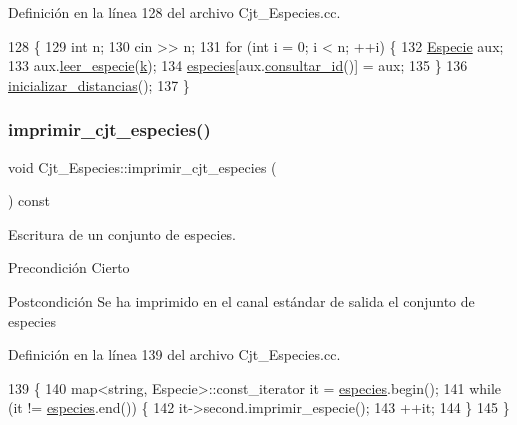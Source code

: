 Definición en la línea 128 del archivo Cjt\+\_\+\+Especies.\+cc.


\begin{DoxyCode}
128                                      \{
129   \textcolor{keywordtype}{int} n;
130   cin >> n;
131   \textcolor{keywordflow}{for} (\textcolor{keywordtype}{int} i = 0; i < n; ++i) \{
132     \hyperlink{class_especie}{Especie} aux;
133     aux.\hyperlink{class_especie_a59b02cb7174198fae20fe23230a527d4}{leer\_especie}(\hyperlink{class_cjt___especies_a4586fb4724b7af4b7f00bb0c0bdd6a17}{k});
134     \hyperlink{class_cjt___especies_a8f319699bd2e8a42b85ec47b67c17563}{especies}[aux.\hyperlink{class_especie_a1652f05cd2ff7dc71123bf538ecc4476}{consultar\_id}()] = aux;
135   \}
136   \hyperlink{class_cjt___especies_a8c711f5a2b07eca652b6086c28e999bc}{inicializar\_distancias}();
137 \}
\end{DoxyCode}
\mbox{\label{class_cjt___especies_ac5f9fbeb99f136c535522466780d4f96}} 
\subsubsection{\texorpdfstring{imprimir\+\_\+cjt\+\_\+especies()}{imprimir\_cjt\_especies()}}
{\footnotesize\ttfamily void Cjt\+\_\+\+Especies\+::imprimir\+\_\+cjt\+\_\+especies (\begin{DoxyParamCaption}{ }\end{DoxyParamCaption}) const}



Escritura de un conjunto de especies. 

\begin{DoxyPrecond}{Precondición}
Cierto 
\end{DoxyPrecond}
\begin{DoxyPostcond}{Postcondición}
Se ha imprimido en el canal estándar de salida el conjunto de especies 
\end{DoxyPostcond}


Definición en la línea 139 del archivo Cjt\+\_\+\+Especies.\+cc.


\begin{DoxyCode}
139                                                \{
140   map<string, Especie>::const\_iterator it = \hyperlink{class_cjt___especies_a8f319699bd2e8a42b85ec47b67c17563}{especies}.begin();
141   \textcolor{keywordflow}{while} (it != \hyperlink{class_cjt___especies_a8f319699bd2e8a42b85ec47b67c17563}{especies}.end()) \{
142     it->second.imprimir\_especie();
143     ++it;
144   \}
145 \}
\end{DoxyCode}
\mbox{\label{class_cjt___especies_a206f42af24c4d59c414aec147e80e7c3}} 
